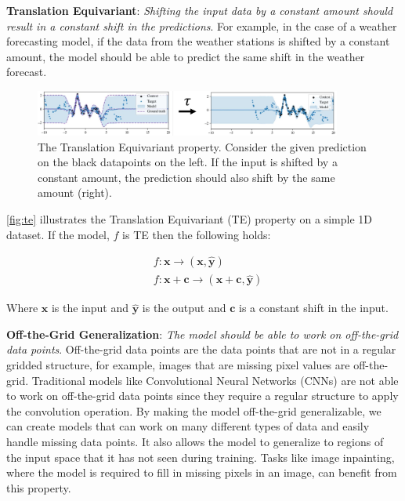 \documentclass[../../main.tex]{subfiles}
\begin{document}
\textbf{Translation Equivariant}: \emph{Shifting the input data by a constant amount should result in a constant shift in the predictions}. For example, in the case of a weather forecasting model, if the data from the weather stations is shifted by a constant amount, the model should be able to predict the same shift in the weather forecast.

\begin{figure}[H]
	\centering
	\includegraphics[width=0.9\textwidth]{./te.PNG}
	\caption{The Translation Equivariant property. Consider the given prediction on the black datapoints on the left. If the input is shifted by a constant amount, the prediction should also shift by the same amount (right).}
	\label{fig:te}
\end{figure}



\autoref{fig:te} illustrates the Translation Equivariant (TE) property on a simple 1D dataset. If the model, $f$ is TE then the following holds:

\begin{align}
	&f: \bm{x} \rightarrow (\bm{x}, \bm{\hat{y}}) \\
	&f: \bm{x} + \bm{c} \rightarrow (\bm{x} + \bm{c}, \bm{\hat{y}})
\end{align}

Where $\bm{x}$ is the input and $\bm{\hat{y}}$ is the output and $\bm{c}$ is a constant shift in the input.


\textbf{Off-the-Grid Generalization}: \emph{The model should be able to work on off-the-grid data points}. Off-the-grid data points are the data points that are not in a regular gridded structure, for example, images that are missing pixel values are off-the-grid. Traditional models like Convolutional Neural Networks (CNNs) are not able to work on off-the-grid data points since they require a regular structure to apply the convolution operation. By making the model off-the-grid generalizable, we can create models that can work on many different types of data and easily handle missing data points. It also allows the model to generalize to regions of the input space that it has not seen during training. Tasks like image inpainting, where the model is required to fill in missing pixels in an image, can benefit from this property.
\end{document}
